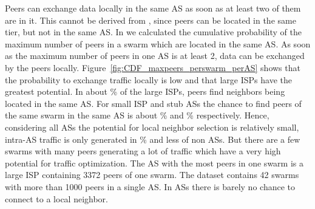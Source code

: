 

Peers can exchange data locally in the same AS as soon as at least two of them are in it. This cannot be derived from , since peers can be located in the same tier, but not in the same AS.
In  we calculated the cumulative probability of the maximum number of peers in a swarm which are located in the same AS. As soon as the maximum number of peers in one AS is at least 2, data can be exchanged by the peers locally. Figure~\ref{fig:CDF_maxpeers_perswarm_perAS} shows that the probability to exchange traffic locally is low and that large ISPs have the greatest potential. In about \unit[15]{\%} of the large ISPs, peers find neighbors being located in the same AS. For small ISP and stub ASs the chance to find peers of the same swarm in the same AS is about \unit[10]{\%} and \unit[12]{\%} respectively. Hence, considering all ASs the potential for local neighbor selection is relatively small, intra-AS traffic is only generated in \unit[15]{\%} and less of non \tier ASs. But there are a few swarms with many peers generating a lot of traffic which have a very high potential for traffic optimization. The AS with the most peers in one swarm is a large ISP containing 3372 peers of one swarm. The dataset contains 42 swarms with more than 1000 peers in a single AS.
In \tier ASs there is barely no chance to connect to a local neighbor.

